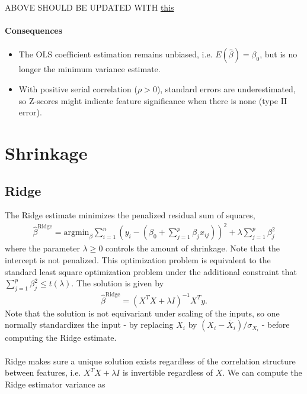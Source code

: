 \documentclass[]{article}
\begin{document}
ABOVE SHOULD BE UPDATED WITH \href{http://web.sgh.waw.pl/~atoroj/econometric_methods/lecture_2_3_sc.pdf}{this}

\paragraph{Consequences}

\begin{itemize}
\item The OLS coefficient estimation remains unbiased, i.e. $E(\hat{\beta})=\beta_0$, but is no longer the minimum variance estimate.
\item With positive serial correlation ($\rho>0$), standard errors are underestimated, so Z-scores might indicate feature significance when there is none (type II error).
\end{itemize}



\section{Shrinkage}

\subsection{Ridge}

The Ridge estimate minimizes the penalized residual sum of squares,
\begin{eqnarray}
\hat{\beta}^{\mathrm{Ridge}} = \mathrm{argmin}_{\beta}\sum_{i=1}^n \left(y_i-(\beta_0 + \sum_{j=1}^p \beta_j x_{ij})\right)^2+\lambda \sum_{j=1}^p \beta_j^2
\end{eqnarray}
where the parameter $\lambda\geq 0$ controls the amount of shrinkage. Note that the intercept is not penalized. This optimization problem is equivalent to the standard least square optimization problem under the additional constraint that $\sum_{j=1}^p \beta_j^2 \leq t(\lambda)$. The solution is given by
\begin{equation}
\hat{\beta}^{\mathrm{Ridge}}=(X^TX+\lambda I)^{-1}X^Ty.
\end{equation}
Note that the solution is not equivariant under scaling of the inputs, so one normally standardizes the input - by replacing $X_i$ by $(X_i-\bar{X}_i)/\sigma_{X_i}$ - before computing the Ridge estimate. \\ \\
Ridge makes sure a unique solution exists regardless of the correlation structure between features, i.e. $X^TX+\lambda I$ is invertible regardless of $X$. We can compute the Ridge estimator variance as
\end{document}
